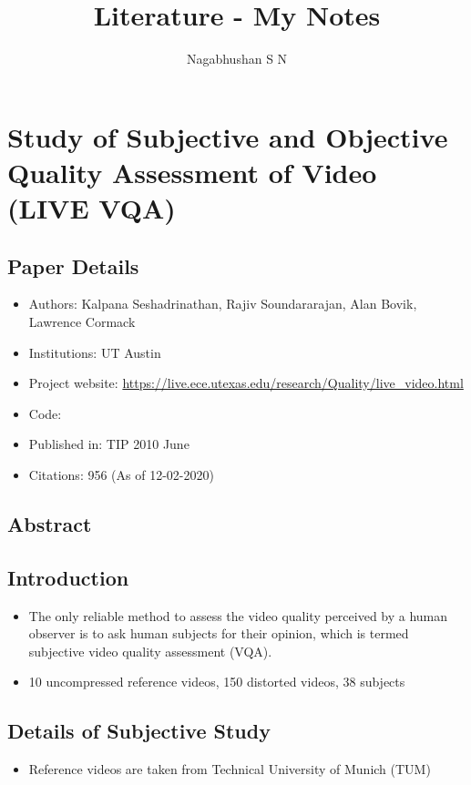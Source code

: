 \documentclass{article}
\title{Literature - My Notes}
\author{Nagabhushan S N}
\begin{document}
    \maketitle
    \tableofcontents
    \newpage


    \section{Study of Subjective and Objective Quality Assessment of Video (LIVE VQA)}\label{sec:Study_of_Subjective_and_Objective_Quality_Assessment_of_Video_(LIVE_VQA)}
    \subsection*{Paper Details}
    \begin{itemize}
        \item Authors: Kalpana Seshadrinathan, Rajiv Soundararajan, Alan Bovik, Lawrence Cormack
        \item Institutions: UT Austin
        \item Project website: \url{https://live.ece.utexas.edu/research/Quality/live_video.html}
        \item Code:
        \item Published in: TIP 2010 June
        \item Citations: 956 (As of 12-02-2020)
    \end{itemize}

    \subsection*{Abstract}

    \subsection{Introduction}\label{subsec:Study_of_Subjective_and_Objective_Quality_Assessment_of_Video_(LIVE_VQA):introduction}
    \begin{itemize}
        \item The only reliable method to assess the video quality perceived by a human observer is to ask human subjects for their opinion, which is termed subjective video quality assessment (VQA).
        \item 10 uncompressed reference videos, 150 distorted videos, 38 subjects
    \end{itemize}

    \subsection{Details of Subjective Study}\label{subsec:Study_of_Subjective_and_Objective_Quality_Assessment_of_Video_(LIVE_VQA):subjective-study}
    \begin{itemize}
        \item Reference videos are taken from Technical University of Munich (TUM)
    \end{itemize}
\end{document}
